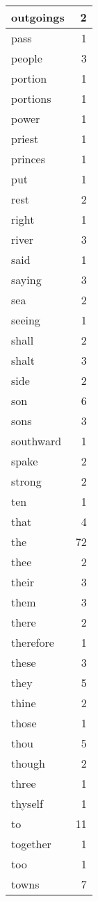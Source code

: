 \begin{center}
\begin{longtable}{l|r}
outgoings & 2 \\ \hline
pass & 1 \\ \hline
people & 3 \\ \hline
portion & 1 \\ \hline
portions & 1 \\ \hline
power & 1 \\ \hline
priest & 1 \\ \hline
princes & 1 \\ \hline
put & 1 \\ \hline
rest & 2 \\ \hline
right & 1 \\ \hline
river & 3 \\ \hline
said & 1 \\ \hline
saying & 3 \\ \hline
sea & 2 \\ \hline
seeing & 1 \\ \hline
shall & 2 \\ \hline
shalt & 3 \\ \hline
side & 2 \\ \hline
son & 6 \\ \hline
sons & 3 \\ \hline
southward & 1 \\ \hline
spake & 2 \\ \hline
strong & 2 \\ \hline
ten & 1 \\ \hline
that & 4 \\ \hline
the & 72 \\ \hline
thee & 2 \\ \hline
their & 3 \\ \hline
them & 3 \\ \hline
there & 2 \\ \hline
therefore & 1 \\ \hline
these & 3 \\ \hline
they & 5 \\ \hline
thine & 2 \\ \hline
those & 1 \\ \hline
thou & 5 \\ \hline
though & 2 \\ \hline
three & 1 \\ \hline
thyself & 1 \\ \hline
to & 11 \\ \hline
together & 1 \\ \hline
too & 1 \\ \hline
towns & 7 \\ \hline

\end{longtable}
\end{center}

